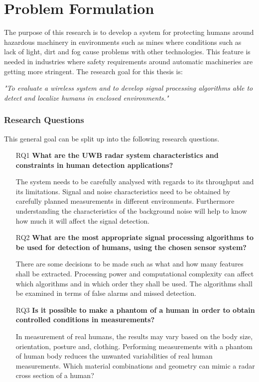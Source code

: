 \section{Problem Formulation}
\label{ProblemFormulation}
The purpose of this research is to develop a system for protecting humans around hazardous machinery in environments such as mines where conditions such as lack of light, dirt and fog cause problems with other technologies. This feature is needed in industries where safety requirements around automatic machineries are getting more stringent. 
The research goal for this thesis is:

\textit{"To evaluate a wireless system and to develop signal processing algorithms able to detect and localize humans in enclosed environments."}

\subsubsection{Research Questions}
This general goal can be split up into the following research questions.
\begin{enumerate}
\item [RQ1] {\textbf{What are the UWB radar system characteristics and constraints in human detection applications?}}

The system needs to be carefully analysed with regards to its throughput and its limitations. Signal and noise characteristics need to be obtained by carefully planned measurements in different environments. Furthermore understanding the characteristics of the background noise will help to know how much it will affect the signal detection.

\item[RQ2] {\textbf{What are the most appropriate signal processing algorithms to be used for detection of humans, using the chosen sensor system?}}

There are some decisions to be made such as what and how many features shall be extracted. Processing power and computational complexity can affect which algorithms and in which order they shall be used. The algorithms shall be examined in terms of false alarms and missed detection.
\item[RQ3] {\textbf{Is it possible to make a phantom of a human in order to obtain controlled conditions in measurements?}}

In measurement of real humans, the results may vary based on the body size, orientation, posture and, clothing. Performing measurements with a  phantom of human body reduces the unwanted variabilities of real human measurements. Which material combinations and geometry can mimic a radar cross section of a human? 
\end{enumerate}
